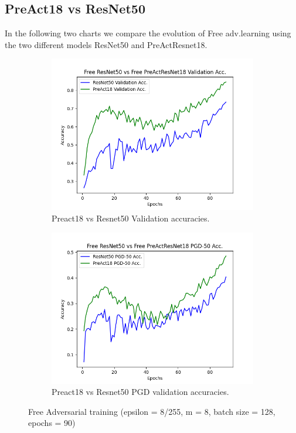 \documentclass{article}
\begin{document}
\subsection{PreAct18 vs ResNet50}
In the following two charts we compare the evolution of Free adv.learning using the two different models ResNet50 and PreActResnet18.



\begin{figure}[hbt!]
  \centering
  \begin{subfigure}[b]{0.4\linewidth}
    \includegraphics[width=\linewidth]{images/freeComp/Figure_1.png}
    \caption{Preact18 vs Resnet50  Validation accuracies.}
  \end{subfigure}
  \begin{subfigure}[b]{0.4\linewidth}
    \includegraphics[width=\linewidth]{images/freeComp/Figure_2.png}
    \caption{Preact18 vs Resnet50 PGD validation accuracies.}
  \end{subfigure}
  \caption{Free Adversarial training (epsilon = 8/255, m = 8, batch size = 128,  epochs = 90)}
  \label{fig:coffee}
\end{figure}
\end{document}
